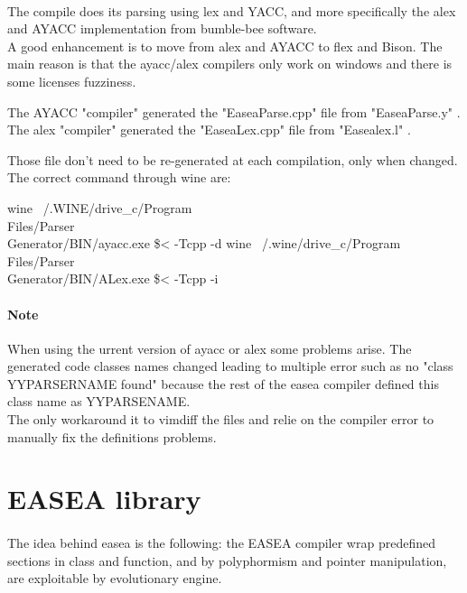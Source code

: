 \documentclass{book}
\begin{document}
   \paragraph{} %
   \label{par:}
   The compile does its parsing using lex and YACC, and more specifically the alex
   and AYACC implementation from bumble-bee software.\\
   A good enhancement is to move from alex and AYACC to flex and Bison. The main
   reason is that the ayacc/alex compilers only work on windows and there is some licenses
   fuzziness.

   The AYACC "compiler" generated the "EaseaParse.cpp" file from "EaseaParse.y" .
   The alex "compiler" generated the "EaseaLex.cpp" file from "Easealex.l" .

   Those file don't need to be re-generated at each compilation, only when changed.
   The correct command through wine are:
   
   wine ~/.WINE/drive\_c/Program\\ Files/Parser\\ Generator/BIN/ayacc.exe \$< -Tcpp -d
   wine ~/.wine/drive\_c/Program\\ Files/Parser\\ Generator/BIN/ALex.exe \$< -Tcpp -i
   
   \paragraph{Note} %
   \label{par:Note}
   When using the urrent version of ayacc or alex some problems arise. The generated
   code classes names changed leading to multiple error such as no "class
   YYPARSERNAME found" because the rest of the easea compiler defined this class
   name as YYPARSENAME.\\
   The only workaround it to vimdiff the files and relie on the compiler error to
   manually fix the definitions problems.
  \section{EASEA library} %
  \paragraph{} %
  \label{par:}
  The idea behind easea is the following: the EASEA compiler wrap predefined
  sections in class and function, and by polyphormism and pointer manipulation, are
  exploitable by evolutionary engine.
\end{document}
